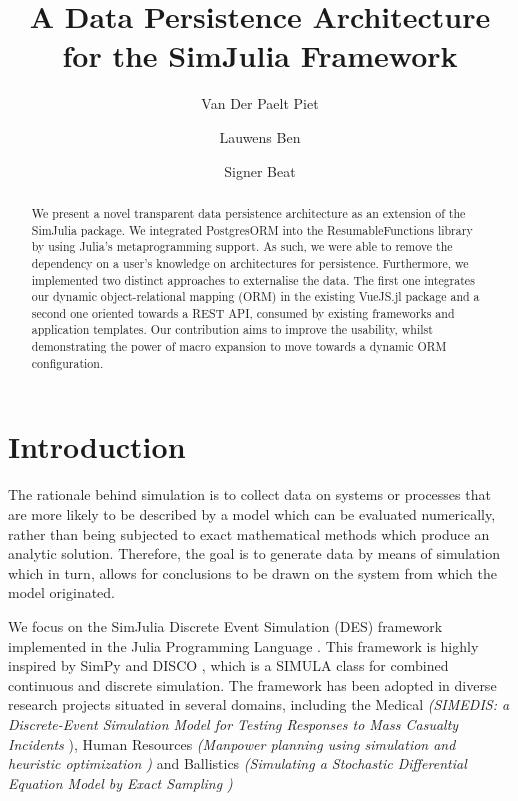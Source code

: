 \documentclass{juliacon}
\begin{document}
%
%

\title{ A Data Persistence Architecture for the SimJulia Framework}

\author[1]{Van Der Paelt Piet}
\author[1]{Lauwens Ben}
\author[2]{Signer Beat}


\maketitle

\begin{abstract}
We present a novel transparent data persistence architecture as an extension of the SimJulia package. We integrated PostgresORM into the ResumableFunctions library by using Julia's metaprogramming support. As such, we were able to remove the dependency on a user's knowledge on architectures for persistence. Furthermore, we implemented two distinct approaches to externalise the data. The first one integrates our dynamic object-relational mapping (ORM) in the existing VueJS.jl package and a second one oriented towards a REST API, consumed by existing frameworks and application templates. Our contribution aims to improve the usability, whilst demonstrating the power of macro expansion to move towards a dynamic ORM configuration.
\end{abstract}

\section{Introduction}

The rationale behind simulation is to collect data on systems or processes that are more likely to be described by a model which can be evaluated numerically, rather than being subjected  to exact mathematical methods which produce an analytic solution\cite{law2007simulation}. Therefore, the goal is to generate data by means of simulation which in turn, allows for conclusions to be drawn on the system from which the model originated.\vskip 6pt

We focus on the SimJulia \cite{lauwens2017simjulia,lauwens2017simjuliaSite} Discrete Event Simulation (DES) framework implemented in the Julia Programming Language \cite{bezanson2017julia}. This framework is highly inspired by SimPy \cite{SimPy} and DISCO \cite{helsgaun1980disco}, which is a SIMULA \cite{DahlNygaard1966simula} class for combined continuous and discrete simulation. The framework has been adopted in diverse research projects situated in several domains, including the Medical \textit{(SIMEDIS: a Discrete-Event Simulation Model for Testing Responses to Mass Casualty Incidents} \cite{de2018simedis}), Human Resources \textit{(Manpower planning using simulation and heuristic optimization \cite{abdessameud2019manpower})} and Ballistics \textit{(Simulating a Stochastic Differential Equation Model by Exact Sampling \cite{hermosilla2017ballistics})}\vskip 6pt
\end{document}
